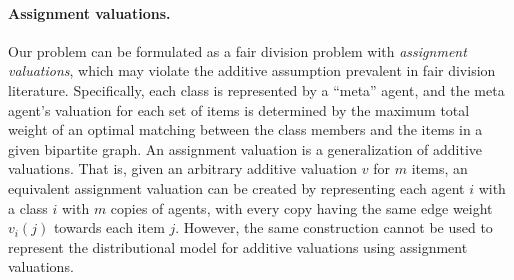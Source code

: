 \paragraph{Assignment valuations.}
Our problem can be formulated as a fair division problem with \emph{assignment valuations}, which may violate the additive assumption prevalent in fair division literature. Specifically, each class is represented by a ``meta'' agent, and the meta agent's valuation for each set of items is determined by the maximum total weight of an optimal matching between the class members and the items in a given bipartite graph.  
An assignment valuation is a generalization of additive valuations. That is, given an arbitrary additive valuation $v$ for $m$ items, an equivalent assignment valuation can be created by representing each agent $i$ with a class $i$ with $m$ copies of agents, with every copy having the same edge weight $v_i(j)$ towards each item $j$. 
However, the same construction cannot be used to represent the distributional model for additive valuations using assignment valuations.
%



